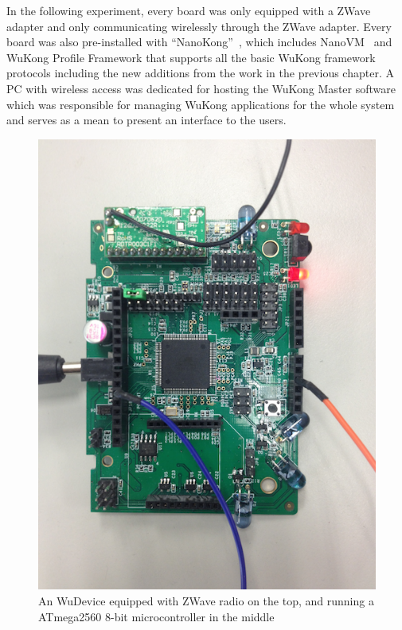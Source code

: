 In the following experiment, every board was only equipped with a ZWave adapter
and only communicating wirelessly through the ZWave adapter.  Every board was
also pre-installed with “NanoKong”~\cite{Su}, which includes
NanoVM~\cite{Harbaum2006} and WuKong Profile Framework that supports all the
basic WuKong framework protocols including the new additions from the work in
the previous chapter. A PC with wireless access was dedicated for hosting the
WuKong Master software which was responsible for managing WuKong applications
for the whole system and serves as a mean to present an interface to the users.  

\begin{figure}[h!]
\centering
    \includegraphics[width=\linewidth]{figures/wudevice}
\caption{An WuDevice equipped with ZWave radio on the top, and running
  a ATmega2560 8-bit microcontroller in the middle}
\label{fig:wudevice}
\end{figure}

